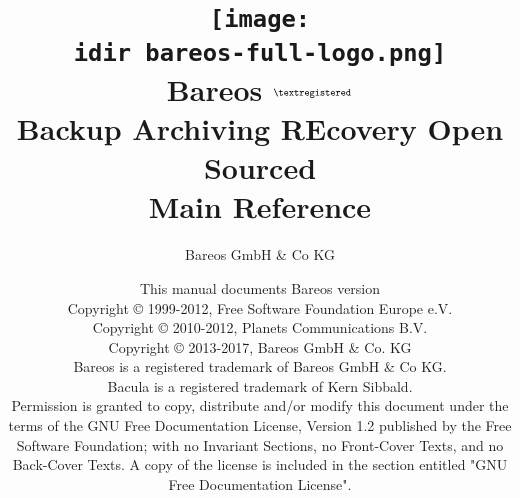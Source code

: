 
\begin{titlepage}

\title{%
\texttt{[image: \\idir bareos-full-logo.png]} \\
\Huge{Bareos} $^{\normalsize \textregistered}$\\
\huge{Backup Archiving REcovery Open Sourced}\\[2ex]
Main Reference\\
}

\author{Bareos GmbH \& Co KG}
\date{This manual documents Bareos version \version \\
      \vspace{0.2in}
      Copyright {\copyright} 1999-2012, Free Software Foundation Europe e.V. \\
      Copyright {\copyright} 2010-2012, Planets Communications B.V. \\
      Copyright {\copyright} 2013-2017, Bareos GmbH \& Co. KG \\
      Bareos {\textregistered} is a registered trademark of Bareos GmbH \& Co KG.\\
      Bacula {\textregistered} is a registered trademark of Kern Sibbald.\\
      \vspace{0.2in}
  Permission is granted to copy, distribute and/or modify this document under the terms of the
  GNU Free Documentation License, Version 1.2 published by the Free Software Foundation;
  with no Invariant Sections, no Front-Cover Texts, and no Back-Cover Texts.
  A copy of the license is included in the section entitled "GNU Free Documentation License".
}

\maketitle

\end{titlepage}

